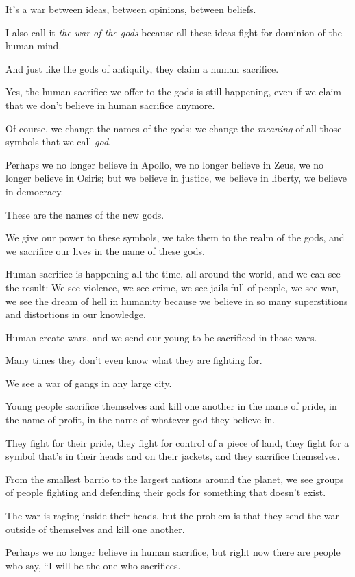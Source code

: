 \documentclass{article}
\numberwithin{equation}{section}
\begin{document}
It's a war between ideas, between opinions, between beliefs.

I also call it \textit{the war of the gods} because all these ideas fight for dominion of the human mind.

And just like the gods of antiquity, they claim a human sacrifice.

%
Yes, the human sacrifice we offer to the gods is still happening, even if we claim that we don't believe in human sacrifice anymore.

Of course, we change the names of the gods; we change the \textit{meaning} of all those symbols that we call \textit{god}.

Perhaps we no longer believe in Apollo, we no longer believe in Zeus, we no longer believe in Osiris; but we believe in justice, we believe in liberty, we believe in democracy.

These are the names of the new gods.

We give our power to these symbols, we take them to the realm of the gods, and we sacrifice our lives in the name of these gods.

%
Human sacrifice is happening all the time, all around the world, and we can see the result: We see violence, we see crime, we see jails full of people, we see war, we see the dream of hell in humanity because we believe in so many superstitions and distortions in our knowledge.

%
Human create wars, and we send our young to be sacrificed in those wars.

Many times they don't even know what they are fighting for.

%
We see a war of gangs in any large city.

Young people sacrifice themselves and kill one another in the name of pride, in the name of profit, in the name of whatever god they believe in.

They fight for their pride, they fight for control of a piece of land, they fight for a symbol that's in their heads and on their jackets, and they sacrifice themselves.

From the smallest barrio to the largest nations around the planet, we see groups of people fighting and defending their gods for something that doesn't exist.

The war is raging inside their heads, but the problem is that they send the war outside of themselves and kill one another.

%
Perhaps we no longer believe in human sacrifice, but right now there are people who say, ``I will be the one who sacrifices.
\end{document}
